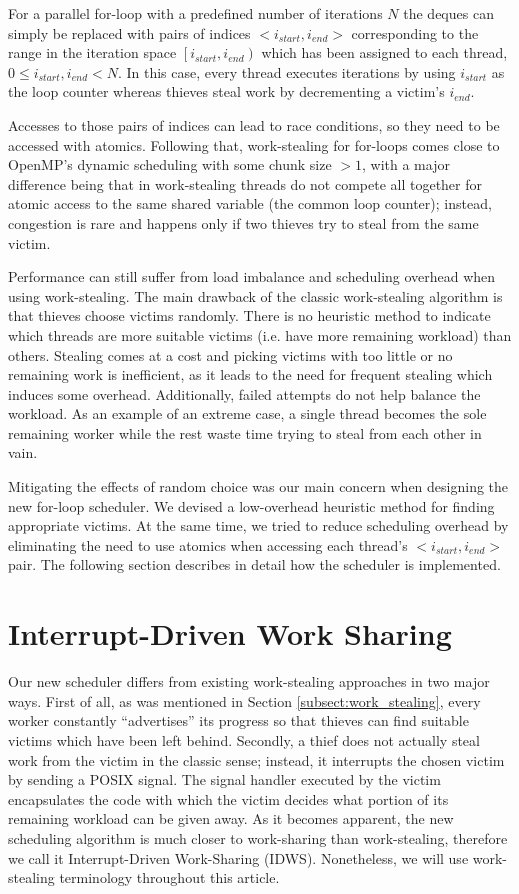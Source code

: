 \documentclass{acm_proc_article-sp}
\begin{document}
For a parallel for-loop with a predefined number of iterations $N$ the deques 
can simply be replaced with pairs of indices $<i_{start},i_{end}>$ 
corresponding to the range in the iteration space 
$\left[i_{start},i_{end}\right)$ which has been assigned to each thread, $0 
\leq i_{start},i_{end} < N$. In this case, every thread executes iterations by 
using $i_{start}$ as the loop counter whereas thieves steal work by 
decrementing a victim's $i_{end}$.

Accesses to those pairs of indices can lead to race conditions, so they need to 
be accessed with atomics. Following that, work-stealing for for-loops comes 
close to OpenMP's dynamic scheduling with some chunk size $>1$, with a major 
difference being that in work-stealing threads do not compete all together for 
atomic access to the same shared variable (the common loop counter); instead, 
congestion is rare and happens only if two thieves try to steal from the same 
victim.

Performance can still suffer from load imbalance and scheduling overhead when 
using work-stealing. The main drawback of the classic work-stealing algorithm 
is that thieves choose victims randomly. There is no heuristic method to 
indicate which threads are more suitable victims (i.e. have more remaining 
workload) than others. Stealing comes at a cost and picking victims with too 
little or no remaining work is inefficient, as it leads to the need for 
frequent stealing which induces some overhead. Additionally, failed attempts do 
not help balance the workload. As an example of an extreme case, a single 
thread becomes the sole remaining worker while the rest waste time trying to 
steal from each other in vain.

Mitigating the effects of random choice was our main concern when designing the 
new for-loop scheduler. We devised a low-overhead heuristic method for finding 
appropriate victims. At the same time, we tried to reduce scheduling overhead 
by eliminating the need to use atomics when accessing each thread's 
$<i_{start},i_{end}>$ pair. The following section describes in detail how the 
scheduler is implemented.


\section{Interrupt-Driven Work Sharing}
\label{sect:new_alg}
Our new scheduler differs from existing work-stealing approaches in two major 
ways. First of all, as was mentioned in Section \ref{subsect:work_stealing}, 
every worker constantly ``advertises'' its progress so that thieves can find 
suitable victims which have been left behind. Secondly, a thief does not 
actually steal work from the victim in the classic sense; instead, it 
interrupts the chosen victim by sending a POSIX signal. The signal handler 
executed by the victim encapsulates the code with which the victim decides what 
portion of its remaining workload can be given away. As it becomes apparent, 
the new scheduling algorithm is much closer to work-sharing than work-stealing, 
therefore we call it Interrupt-Driven Work-Sharing (IDWS). Nonetheless, we will 
use work-stealing terminology throughout this article.
\end{document}
